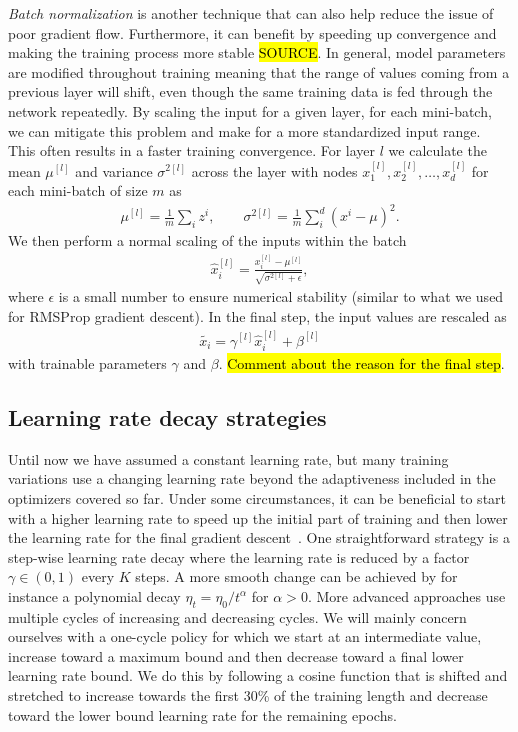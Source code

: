 \textit{Batch normalization} is another technique that can also help reduce the issue of poor gradient flow. Furthermore, it can benefit by speeding up convergence and making the training process more stable \hl{SOURCE}. In general, model parameters are modified throughout training meaning that the range of values coming from a previous layer will shift, even though the same training data is fed through the network repeatedly. By scaling the input for a given layer, for each mini-batch, we can mitigate this problem and make for a more standardized input range. This often results in a faster training convergence. For layer $l$ we calculate the mean $\mu^{[l]}$ and variance $\sigma^{2[l]}$ across the layer with nodes $x_1^{[l]}, x_2^{[l]}, \ldots, x_d^{[l]}$ for each mini-batch of size $m$ as
\begin{align*}
  \mu^{[l]} = \frac{1}{m} \sum_i z^i, \qquad \sigma^{2[l]} = \frac{1}{m} \sum_i^d (x^i-\mu)^2.
\end{align*}
We then perform a normal scaling of the inputs within the batch
\begin{align*}
  \hat{x}_i^{[l]} = \frac{x_i^{[l]} - \mu^{[l]}}{\sqrt{\sigma^{2[l]} + \epsilon}},
\end{align*}
where $\epsilon$ is a small number to ensure numerical stability (similar to what we used for \acrshort{RMSProp} gradient descent). In the final step, the input values are rescaled as
\begin{align*}
  \tilde{x_i} = \gamma^{[l]} \hat{x}_i^{[l]} + \beta^{[l]}
\end{align*}
with trainable parameters $\gamma$ and $\beta$. \hl{Comment about the reason for the final step}.


\subsection{Learning rate decay strategies}
Until now we have assumed a constant learning rate, but many training variations use a changing learning rate beyond the adaptiveness included in the optimizers covered so far. Under some circumstances, it can be beneficial to start with a higher learning rate to speed up the initial part of training and then lower the learning rate for the final gradient descent~\cite{smith2018disciplined}. One straightforward strategy is a step-wise learning rate decay where the learning rate is reduced by a factor $\gamma \in (0,1)$ every $K$ steps. A more smooth change can be achieved by for instance a polynomial decay $\eta_t = \eta_0/t^{\alpha}$ for $\alpha > 0$. More advanced approaches use multiple cycles of increasing and decreasing cycles. We will mainly concern ourselves with a one-cycle policy for which we start at an
intermediate value, increase toward a maximum bound and then decrease toward a
final lower learning rate bound. We do this by following a cosine function that is shifted and stretched to increase towards the first 30\% of the training length and decrease toward the lower bound learning rate for the remaining epochs. 




